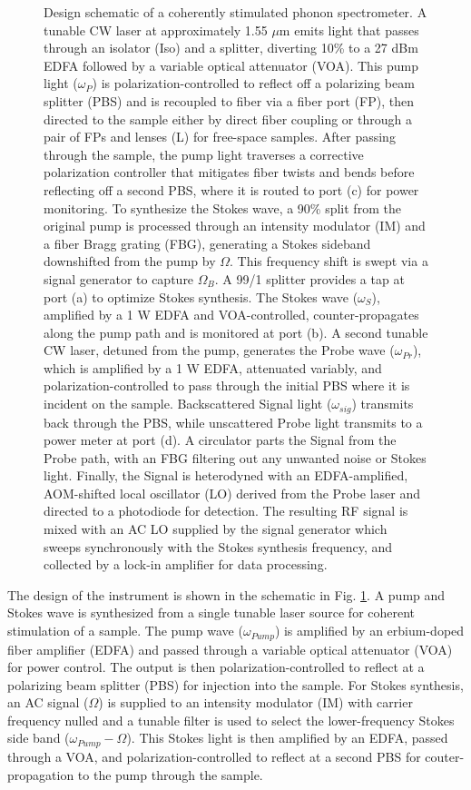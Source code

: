 \documentclass[%
  reprint,
  superscriptaddress,
  amsmath,amssymb,
  aps,
  prapplied,
]{revtex4-2}
\begin{document}
\begin{figure}[htbp]
{Design schematic of a coherently stimulated phonon spectrometer. A tunable CW laser at approximately 1.55 $\mu$m emits light that passes through an isolator (Iso) and a splitter, diverting 10\% to a 27 dBm EDFA followed by a variable optical attenuator (VOA). This pump light ($\omega_P$) is polarization-controlled to reflect off a polarizing beam splitter (PBS) and is recoupled to fiber via a fiber port (FP), then directed to the sample either by direct fiber coupling or through a pair of FPs and lenses (L) for free-space samples. After passing through the sample, the pump light traverses a corrective polarization controller that mitigates fiber twists and bends before reflecting off a second PBS, where it is routed to port (c) for power monitoring. To synthesize the Stokes wave, a 90\% split from the original pump is processed through an intensity modulator (IM) and a fiber Bragg grating (FBG), generating a Stokes sideband downshifted from the pump by $\Omega$. This frequency shift is swept via a signal generator to capture $\Omega_B$. A 99/1 splitter provides a tap at port (a) to optimize Stokes synthesis. The Stokes wave ($\omega_S$), amplified by a 1 W EDFA and VOA-controlled, counter-propagates along the pump path and is monitored at port (b). A second tunable CW laser, detuned from the pump, generates the Probe wave ($\omega_{Pr}$), which is amplified by a 1 W EDFA, attenuated variably, and polarization-controlled to pass through the initial PBS where it is incident on the sample. Backscattered Signal light ($\omega_{sig}$) transmits back through the PBS, while unscattered Probe light transmits to a power meter at port (d). A circulator parts the Signal from the Probe path, with an FBG filtering out any unwanted noise or Stokes light. Finally, the Signal is heterodyned with an EDFA-amplified, AOM-shifted local oscillator (LO) derived from the Probe laser and directed to a photodiode for detection. The resulting RF signal is mixed with an AC LO supplied by the signal generator which sweeps synchronously with the Stokes synthesis frequency, and collected by a lock-in amplifier for data processing.
}
\label{fig:Instrument Design}
\end{figure}

The design of the instrument is shown in the schematic in Fig. \ref{fig:Instrument Design}. A pump and Stokes wave is synthesized from a single tunable laser source for coherent stimulation of a sample. The pump wave ($\omega_{Pump}$) is amplified by an erbium-doped fiber amplifier (EDFA) and passed through a variable optical attenuator (VOA) for power control. The output is then polarization-controlled to reflect at a polarizing beam splitter (PBS) for injection into the sample. For Stokes synthesis, an AC signal ($\Omega$) is supplied to an intensity modulator (IM) with carrier frequency nulled and a tunable filter is used to select the lower-frequency Stokes side band ($\omega_{Pump} - \Omega$). This Stokes light is then amplified by an EDFA, passed through a VOA, and polarization-controlled to reflect at a second PBS for couter-propagation to the pump through the sample.
\end{document}
